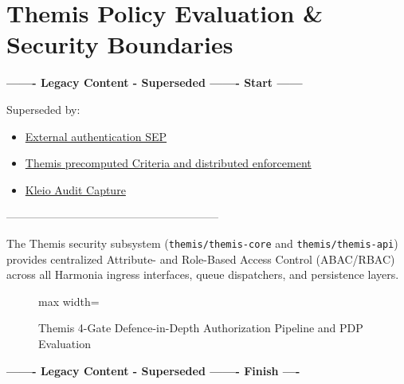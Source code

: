 
\chapter[Themis Policy Evaluation \& Security Boundaries]{Themis Policy Evaluation \&\\Security Boundaries}
\label{chap:themis_security}

\par\noindent\textbf{------- Legacy Content - Superseded ------- Start ------}
\par\noindent Superseded by:
\begin{itemize}
  \item \href{../../markdown/05-information-systems-architecture/component-register.md\#identity-authentication}{External authentication SEP}
  \item \href{../../markdown/05-information-systems-architecture/component-register.md\#pep-context}{Themis precomputed Criteria and distributed enforcement}
  \item \href{../../markdown/05-information-systems-architecture/component-register.md\#c03}{Kleio Audit Capture}
\end{itemize}
\noindent ---------------------------------------------------------

The Themis security subsystem (\texttt{themis/themis-core} and \texttt{themis/themis-api}) provides centralized Attribute- and Role-Based Access Control (ABAC/RBAC) across all Harmonia ingress interfaces, queue dispatchers, and persistence layers.

\begin{figure}[htbp]
    \centering
    \begin{adjustbox}{max width=\textwidth}
        
    \end{adjustbox}
    \caption{Themis 4-Gate Defence-in-Depth Authorization Pipeline and PDP Evaluation}
    \label{fig:themis_security_pipeline}
\end{figure}


\par\noindent\textbf{------- Legacy Content - Superseded ------- Finish ----}

